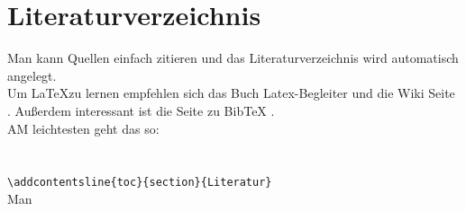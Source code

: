 \documentclass[titlepage, 11pt, a4paper,ngerman]{article}
\begin{document}
\section{Literaturverzeichnis}

Man kann Quellen einfach zitieren und das Literaturverzeichnis wird automatisch angelegt.\\[10pt]
Um \LaTeX zu lernen empfehlen sich das Buch Latex-Begleiter \cite{LatexBegleiter} und die Wiki Seite \cite{LatexWiki}. Außerdem interessant ist die Seite zu BibTeX \cite{BibtexWiki}.\\[10pt]
AM leichtesten geht das so:\\[10pt]
\verb||\\
\verb||\\
\verb|\addcontentsline{toc}{section}{Literatur}|\\[10pt]
Man 



\end{document}
